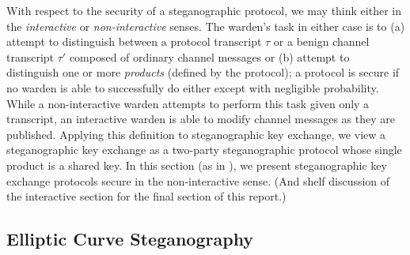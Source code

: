 \documentclass{article}
\begin{document}
With respect to the security of a steganographic protocol, we may think either in the \textit{interactive} or 
\textit{non-interactive} senses.  The warden's task in either case is to (a) attempt to distinguish between 
a protocol transcript $\tau$ or a benign channel transcript $\tau'$ composed of ordinary channel messages or (b) 
attempt to distinguish one or more \textit{products} (defined by the protocol); a protocol is secure if no warden is able 
to successfully do either except with negligible probability.  While a non-interactive warden 
attempts to perform this task given only a transcript, an interactive warden is able to modify channel messages as they 
are published.
\newline\newline
Applying this definition to steganographic key exchange, we view a steganographic key exchange as a two-party steganographic 
protocol whose single product is a shared key.  In this section (as in \cite{BiglouPubKey}), we present steganographic key exchange 
protocols secure in the non-interactive sense.  (And shelf discussion of the interactive section for the final section of 
this report.)  

\subsection{Elliptic Curve Steganography}
\end{document}
